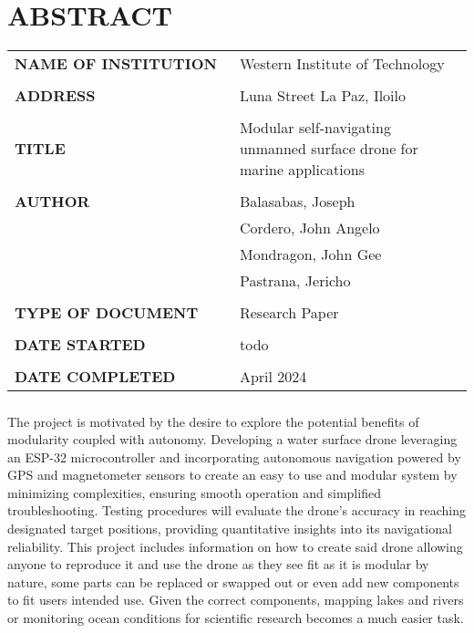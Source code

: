 \chapter*{ABSTRACT}

\vspace{-1cm}
\begin{tabularx}{\linewidth}{@{}p{0.49\linewidth}p{0.51\linewidth}@{}@{}}
\Large {\bf NAME OF INSTITUTION} & \Large Western Institute of Technology \\
\\
\Large {\bf ADDRESS} & \Large Luna Street La Paz, Iloilo \\
\\
\Large{\bf TITLE} & \Large Modular self-navigating unmanned surface drone for marine applications \\
\\
\Large {\bf AUTHOR} & \Large Balasabas, Joseph \\
 & \Large Cordero, John Angelo \\ 
 & \Large Mondragon, John Gee \\
 & \Large Pastrana, Jericho \\
\\
\Large {\bf TYPE OF DOCUMENT} & \Large Research Paper \\
\\
\Large {\bf DATE STARTED} & \Large todo \\
\\
\Large {\bf DATE COMPLETED} & \Large April 2024

\end{tabularx}


\paragraph{} \Large The project is motivated by the desire to explore the potential benefits of modularity coupled with autonomy. Developing a water surface 
            drone leveraging an ESP-32 microcontroller and incorporating autonomous navigation powered by GPS and magnetometer sensors to create an easy
            to use and modular system by minimizing complexities, ensuring smooth operation and simplified troubleshooting. Testing procedures will 
            evaluate the drone's accuracy in reaching designated target positions, providing quantitative insights into its navigational reliability. 
            This project includes information on how to create said drone allowing anyone to reproduce it and use the drone as they see fit as it is 
            modular by nature, some parts can be replaced or swapped out or even add new components to fit users intended use. Given the correct 
            components, mapping lakes and rivers or monitoring ocean conditions for scientific research becomes a much easier task.